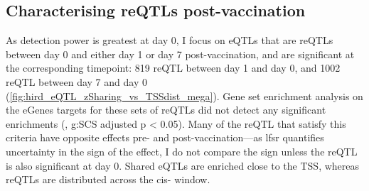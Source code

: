 \subsection{Characterising reQTLs post-vaccination}

As detection power is greatest at day 0, 
I focus on \glspl{eQTL} that are reQTLs between day 0 and either day 1 or day 7 post-vaccination, 
and are significant at the corresponding timepoint:
819 reQTL between day 1 and day 0, 
and 1002 reQTL between day 7 and day 0 (\autoref{fig:hird_eQTL_zSharing_vs_TSSdist_mega}).
Gene set enrichment analysis on the eGenes targets for these sets of \glspl{reQTL} did not detect any significant enrichments (, g:SCS adjusted p < 0.05).
%
%
Many of the \gls{reQTL} that satisfy this criteria have opposite effects pre- and post-vaccination---as lfsr quantifies uncertainty in the sign of the effect, I do not compare the sign unless the reQTL is also significant at day 0.
Shared \glspl{eQTL} are enriched close to the \gls{TSS}, whereas \glspl{reQTL} are distributed across the cis- window.

%

